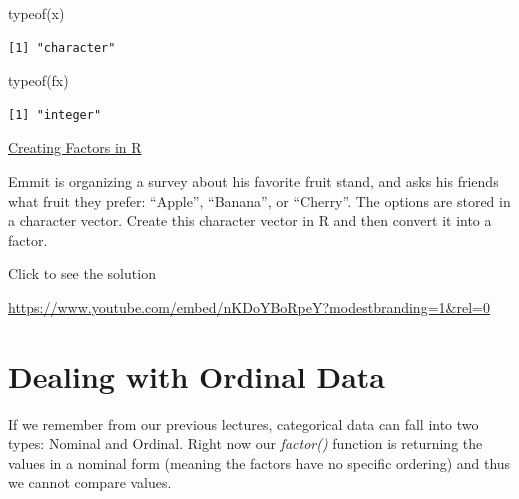 \documentclass[
  letterpaper,
  DIV=11,
  numbers=noendperiod]{scrreprt}
\newenvironment{Shaded}{\begin{snugshade}}{\end{snugshade}}
\newcommand{\FunctionTok}[1]{\textcolor[rgb]{0.28,0.35,0.67}{#1}}
\newcommand{\NormalTok}[1]{\textcolor[rgb]{0.00,0.23,0.31}{#1}}
\begin{document}
\begin{Shaded}
\begin{Highlighting}[]
\FunctionTok{typeof}\NormalTok{(x)}
\end{Highlighting}
\end{Shaded}

\begin{verbatim}
[1] "character"
\end{verbatim}

\begin{Shaded}
\begin{Highlighting}[]
\FunctionTok{typeof}\NormalTok{(fx)}
\end{Highlighting}
\end{Shaded}

\begin{verbatim}
[1] "integer"
\end{verbatim}

\begin{watch}{}{}
    \href{https://youtu.be/UoPKvEKD9K4}{Creating Factors in R}
\end{watch}

\begin{tcolorbox}[enhanced jigsaw, colframe=quarto-callout-tip-color-frame, colback=white, breakable, rightrule=.15mm, title=\textcolor{quarto-callout-tip-color}{\faLightbulb}\hspace{0.5em}{Try it Out}, bottomtitle=1mm, toptitle=1mm, titlerule=0mm, left=2mm, coltitle=black, colbacktitle=quarto-callout-tip-color!10!white, leftrule=.75mm, opacitybacktitle=0.6, bottomrule=.15mm, opacityback=0, arc=.35mm, toprule=.15mm]

Emmit is organizing a survey about his favorite fruit stand, and asks
his friends what fruit they prefer: ``Apple'', ``Banana'', or
``Cherry''. The options are stored in a character vector. Create this
character vector in R and then convert it into a factor.

Click to see the solution

\url{https://www.youtube.com/embed/nKDoYBoRpeY?modestbranding=1&rel=0}

\end{tcolorbox}

\section{Dealing with Ordinal Data}\label{dealing-with-ordinal-data}

If we remember from our previous lectures, categorical data can fall
into two types: Nominal and Ordinal. Right now our \emph{factor()}
function is returning the values in a nominal form (meaning the factors
have no specific ordering) and thus we cannot compare values.
\end{document}
